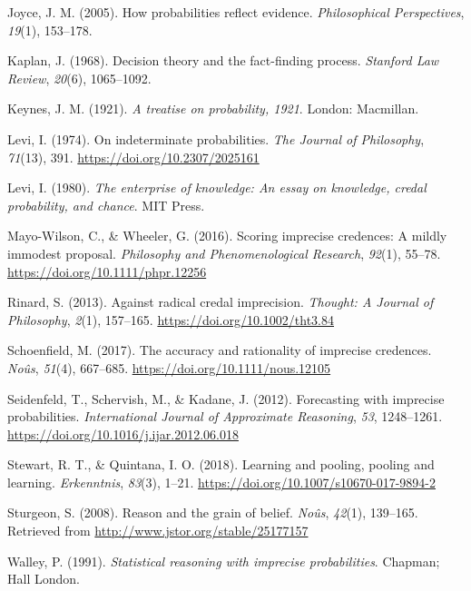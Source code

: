 \documentclass[
  10pt,
  dvipsnames,enabledeprecatedfontcommands]{scrartcl}
\newlength{\cslhangindent}
\newlength{\cslentryspacingunit} %
\newenvironment{CSLReferences}[2] %
 {%
  \setlength{\parindent}{0pt}
  \ifodd #1
  \let\oldpar\par
  \def\par{\hangindent=\cslhangindent\oldpar}
  \fi
  \setlength{\parskip}{#2\cslentryspacingunit}
 }%
 {}
\begin{document}
\begin{CSLReferences}{1}{0}
\leavevmode{}%
Joyce, J. M. (2005). How probabilities reflect evidence.
\emph{Philosophical Perspectives}, \emph{19}(1), 153--178.

\leavevmode{}%
Kaplan, J. (1968). Decision theory and the fact-finding process.
\emph{Stanford Law Review}, \emph{20}(6), 1065--1092.

\leavevmode{}%
Keynes, J. M. (1921). \emph{A treatise on probability, 1921}. London:
Macmillan.

\leavevmode{}%
Levi, I. (1974). On indeterminate probabilities. \emph{The Journal of
Philosophy}, \emph{71}(13), 391. \url{https://doi.org/10.2307/2025161}

\leavevmode{}%
Levi, I. (1980). \emph{The enterprise of knowledge: An essay on
knowledge, credal probability, and chance}. MIT Press.

\leavevmode{}%
Mayo-Wilson, C., \& Wheeler, G. (2016). Scoring imprecise credences: A
mildly immodest proposal. \emph{Philosophy and Phenomenological
Research}, \emph{92}(1), 55--78.
\url{https://doi.org/10.1111/phpr.12256}

\leavevmode{}%
Rinard, S. (2013). Against radical credal imprecision. \emph{Thought: A
Journal of Philosophy}, \emph{2}(1), 157--165.
\url{https://doi.org/10.1002/tht3.84}

\leavevmode{}%
Schoenfield, M. (2017). The accuracy and rationality of imprecise
credences. \emph{Noûs}, \emph{51}(4), 667--685.
\url{https://doi.org/10.1111/nous.12105}

\leavevmode{}%
Seidenfeld, T., Schervish, M., \& Kadane, J. (2012). Forecasting with
imprecise probabilities. \emph{International Journal of Approximate
Reasoning}, \emph{53}, 1248--1261.
\url{https://doi.org/10.1016/j.ijar.2012.06.018}

\leavevmode{}%
Stewart, R. T., \& Quintana, I. O. (2018). Learning and pooling, pooling
and learning. \emph{Erkenntnis}, \emph{83}(3), 1--21.
\url{https://doi.org/10.1007/s10670-017-9894-2}

\leavevmode{}%
Sturgeon, S. (2008). Reason and the grain of belief. \emph{No{û}s},
\emph{42}(1), 139--165. Retrieved from
\url{http://www.jstor.org/stable/25177157}

\leavevmode{}%
Walley, P. (1991). \emph{Statistical reasoning with imprecise
probabilities}. Chapman; Hall London.

\end{CSLReferences}
\end{document}
